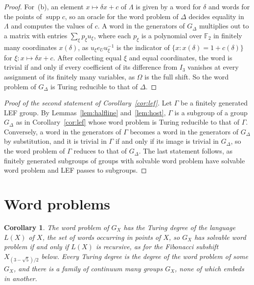 \documentclass[11pt]{amsart}
\newtheorem{corollary}[theorem]{Corollary}
\newcommand{\F}{\mathbb F}
\begin{document}
\begin{proof}
For~(b), an element $x\mapsto\delta x+c$ of $\Lambda$ is given by a word
for $\delta$ and words for the points of $\operatorname{supp}c$, so an
oracle for the word problem of $\Delta$ decides equality in $\Lambda$
and computes the values of $c$. A word in the generators of $G_\Delta$
multiplies out to a matrix with entries $\sum_\xi p_\xi u_\xi$, where each
$p_\xi$ is a polynomial over $\F_2$ in finitely many coordinates
$x(\delta)$, as $u_\xi e_Uu_\xi^{-1}$ is the indicator of
$\{x:x(\delta)=1+c(\delta)\}$ for $\xi\colon x\mapsto\delta x+c$. After
collecting equal $\xi$ and equal coordinates, the word is trivial if and
only if every coefficient of its difference from $I_3$ vanishes at every
assignment of its finitely many variables, as $\Omega$ is the full shift.
So the word problem of $G_\Delta$ is Turing reducible to that of $\Delta$.
\end{proof}

\begin{proof}[Proof of the second statement of Corollary~\ref{cor:lef}]
Let $\Gamma$ be a finitely generated LEF group. By
Lemmas~\ref{lem:halfline} and~\ref{lem:host}, $\Gamma$ is a subgroup of a
group $G_\Delta$ as in Corollary~\ref{cor:lef} whose word problem is Turing
reducible to that of $\Gamma$. Conversely, a word in the generators of
$\Gamma$ becomes a word in the generators of $G_\Delta$ by substitution,
and it is trivial in $\Gamma$ if and only if its image is trivial in
$G_\Delta$, so the word problem of $\Gamma$ reduces to that of $G_\Delta$.
The last statement follows, as finitely generated subgroups of groups with
solvable word problem have solvable word problem and LEF passes to
subgroups.
\end{proof}

\section{Word problems}\label{sec:wp}

\begin{corollary}\label{cor:wp}
The word problem of $G_X$ has the Turing degree of the language $L(X)$ of
$X$, the set of words occurring in points of $X$, so $G_X$ has solvable
word problem if and only if $L(X)$ is recursive, as for the Fibonacci
subshift $X_{(3-\sqrt5)/2}$ below. Every Turing degree is the degree of the
word problem of some $G_X$, and there is a family of continuum many groups
$G_X$, none of which embeds in another.
\end{corollary}
\end{document}
